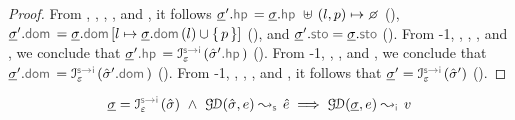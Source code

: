 \begin{proof}
 \noindent From , , , , and , it follows 
 $\istate'.\hpsel = \istate.\hpsel \dunion (\loc, p) \mapsto \none$ (), 
 $\istate'.\domsel = \istate.\domsel[\loc \mapsto \istate.\domsel(\loc) \cup \jsilset{p}]$ (), 
 and $\istate'.\stosel = \istate.\stosel$ (). 
 From \hyp{1}, ,  , , and , we conclude that $\istate'.\hpsel = \interpret{\symbinst}{\senv}(\sstate'.\hpsel)$ (). 
 From \hyp{1}, , , and , we conclude that $\istate'.\domsel =  \interpret{\symbinst}{\senv}(\sstate'.\domsel)$ (). 
 From \hyp{1}, , , , and , it follows that $\istate' = \interpret{\symbinst}{\senv}(\sstate')$ (). 
 \end{proof}


\begin{lemma}
$$
\istate = \interpret{\symbinst}{\senv}(\sstate) \ \wedge \ 
  \absgetdomainrule{\symbolic}{\sstate, \jsilexpr}{\sexpr}  
  \implies \absgetdomainrule{\instrumented}{\istate, \jsilexpr}{\val}
$$
\end{lemma}
